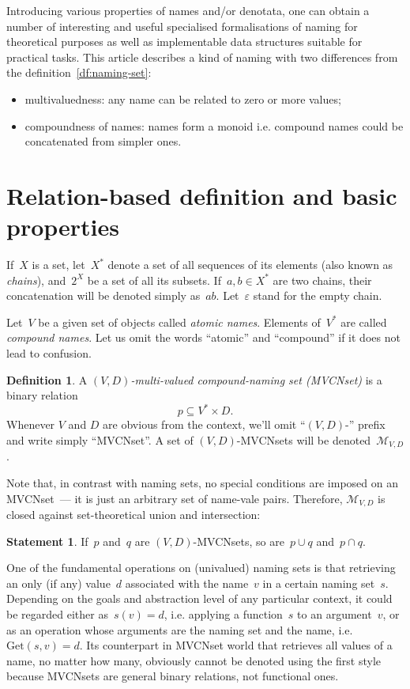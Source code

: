\documentclass{article}
\theoremstyle{definition}
\newtheorem{Df}{Definition}
\newtheorem{St}{Statement}
\newcommand{\setcharmvcn}{M}
\newcommand{\setsymbol}[3]{\mathcal{#1}_{#2,#3}}
\newcommand{\setmvcn}[2]{\setsymbol{\setcharmvcn}{#1}{#2}}
\newcommand{\derefsymbol}{\mathrm{Get}}
\newcommand{\deref}[2]{\derefsymbol(#1, #2)}
\begin{document}
Introducing various properties of names and/or denotata, one can obtain a
number of interesting and useful specialised formalisations of naming for
theoretical purposes as well as implementable data structures suitable for
practical tasks. This article describes a kind of naming with
two differences from the definition~\ref{df:naming-set}:
\begin{itemize}
\item multivaluedness: any name can be related to zero or more values;
\item compoundness of names: names form a monoid i.e. compound names could
be concatenated from simpler ones.
\end{itemize}


\section{Relation-based definition and basic properties}

If~$X$ is a set, let~$X^\ast$ denote a set of all sequences of its elements
(also known as \emph{chains}), and~$2^X$ be a set of all its subsets.
If~$a,b\in X^\ast$ are two chains, their concatenation will be denoted simply
as~$ab$. Let~$\varepsilon$ stand for the empty chain.

Let~$V$ be a given set of objects called \emph{atomic names}. Elements
of~$V^\ast$ are called \emph{compound names}. Let us omit the words ``atomic''
and ``compound'' if it does not lead to confusion.

\begin{Df}\label{df:mvcn}
A \emph{$(V,D)$-multi-valued compound-naming set (MVCNset)} is a binary
relation
\[
  p \subseteq V^\ast \times D .
\]
Whenever $V$ and $D$ are obvious from the context, we'll omit ``$(V,D)$-''
prefix and write simply ``MVCNset''. A set of $(V,D)$-MVCNsets will be
denoted~$\setmvcn{V}{D}$.
\end{Df}

Note that, in contrast with naming sets, no special conditions are imposed
on an MVCNset~--- it is just an arbitrary set of name-vale pairs.
Therefore, $\setmvcn{V}{D}$ is closed against set-theoretical union
and intersection:
\begin{St}\label{st:mvcn-setop}
If~$p$ and~$q$ are $(V,D)$-MVCNsets, so are~$p\cup q$ and~$p\cap q$.
\end{St}

One of the fundamental operations on (univalued) naming sets is that retrieving
an only (if any) value~$d$ associated with the name~$v$ in a certain naming
set~$s$.  Depending on the goals and abstraction level of any particular
context, it could be regarded either as~$s(v)=d$, i.e. applying a function~$s$
to an argument~$v$, or as an operation whose arguments are the naming set and
the name, i.e.~$\deref{s}{v}=d$. Its counterpart in MVCNset world that
retrieves all values of a name, no matter how many, obviously cannot be denoted
using the first style because MVCNsets are general binary relations, not
functional ones.
\end{document}
